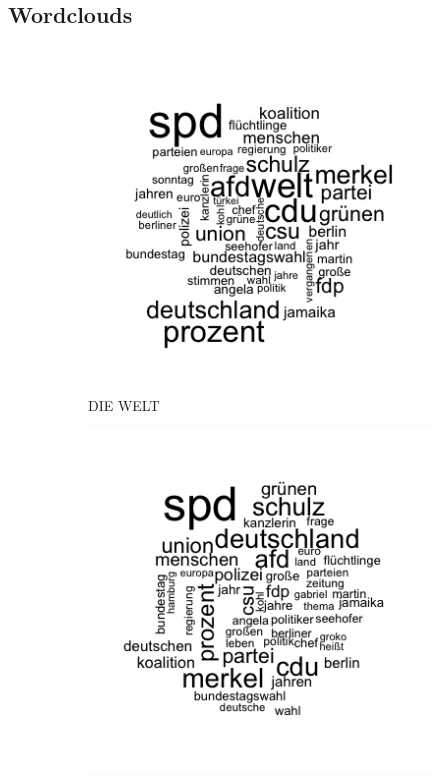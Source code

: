 \documentclass[12pt,a4paper,notitlepage]{article}
\begin{document}
\subsection{Wordclouds}\label{apx_wordclouds}
\begin{figure}[H]
	\begin{center}
		\begin{subfigure}[normla]{0.43\textwidth}
			\includegraphics[width=\textwidth]{figs/wordcloud_DIEWELT.png}
			\caption{DIE WELT}
		\end{subfigure}
		\begin{subfigure}[normla]{0.43\textwidth}
			\includegraphics[width=\textwidth]{figs/wordcloud_FOCUSONLINE.png}

\end{subfigure}
\end{center}
\end{figure}
\end{document}
